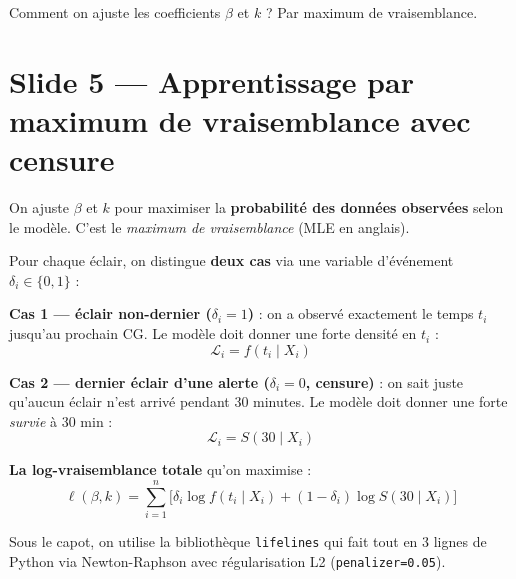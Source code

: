 \documentclass[11pt,a4paper]{article}
\begin{document}
\begin{transit}
\og Comment on ajuste les coefficients $\beta$ et $k$ ? Par maximum de vraisemblance. \fg{}
\end{transit}

\section{Slide 5 — Apprentissage par maximum de vraisemblance avec censure}

\begin{dire}
\og On ajuste $\beta$ et $k$ pour maximiser la \textbf{probabilité des données observées}
selon le modèle. C'est le \emph{maximum de vraisemblance} (MLE en anglais).

Pour chaque éclair, on distingue \textbf{deux cas} via une variable d'événement
$\delta_i \in \{0, 1\}$ :

\textbf{Cas 1 — éclair non-dernier ($\delta_i = 1$)} : on a observé exactement le temps
$t_i$ jusqu'au prochain CG. Le modèle doit donner une forte densité en $t_i$ :
$$\mathcal{L}_i = f(t_i \mid X_i)$$

\textbf{Cas 2 — dernier éclair d'une alerte ($\delta_i = 0$, censure)} : on sait juste
qu'aucun éclair n'est arrivé pendant 30 minutes. Le modèle doit donner une forte
\emph{survie} à 30 min :
$$\mathcal{L}_i = S(30 \mid X_i)$$

\textbf{La log-vraisemblance totale} qu'on maximise :
$$\ell(\beta, k) = \sum_{i=1}^{n} \Big[ \delta_i \log f(t_i \mid X_i) + (1-\delta_i) \log S(30 \mid X_i) \Big]$$

Sous le capot, on utilise la bibliothèque \texttt{lifelines} qui fait tout en 3 lignes
de Python via Newton-Raphson avec régularisation L2 (\texttt{penalizer=0.05}). \fg{}
\end{dire}
\end{document}
